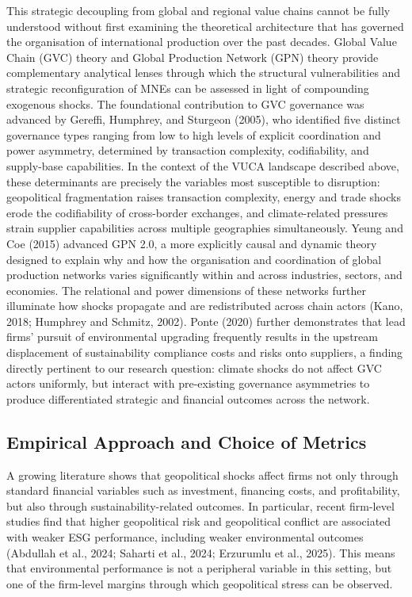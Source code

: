 \documentclass[authoryear,preprint,review,12pt]{elsarticle}
\begin{document}
This strategic decoupling from global and regional value chains cannot be fully understood without first examining the theoretical architecture that has governed the organisation of international production over the past decades. Global Value Chain (GVC) theory and Global Production Network (GPN) theory provide complementary analytical lenses through which the structural vulnerabilities and strategic reconfiguration of MNEs can be assessed in light of compounding exogenous shocks. The foundational contribution to GVC governance was advanced by Gereffi, Humphrey, and Sturgeon (2005), who identified five distinct governance types ranging from low to high levels of explicit coordination and power asymmetry, determined by transaction complexity, codifiability, and supply-base capabilities. In the context of the VUCA landscape described above, these determinants are precisely the variables most susceptible to disruption: geopolitical fragmentation raises transaction complexity, energy and trade shocks erode the codifiability of cross-border exchanges, and climate-related pressures strain supplier capabilities across multiple geographies simultaneously. Yeung and Coe (2015) advanced GPN 2.0, a more explicitly causal and dynamic theory designed to explain why and how the organisation and coordination of global production networks varies significantly within and across industries, sectors, and economies. The relational and power dimensions of these networks further illuminate how shocks propagate and are redistributed across chain actors (Kano, 2018; Humphrey and Schmitz, 2002). Ponte (2020) further demonstrates that lead firms' pursuit of environmental upgrading frequently results in the upstream displacement of sustainability compliance costs and risks onto suppliers, a finding directly pertinent to our research question: climate shocks do not affect GVC actors uniformly, but interact with pre-existing governance asymmetries to produce differentiated strategic and financial outcomes across the network.

\subsection{Empirical Approach and Choice of Metrics}

A growing literature shows that geopolitical shocks affect firms not only through standard financial variables such as investment, financing costs, and profitability, but also through sustainability-related outcomes. In particular, recent firm-level studies find that higher geopolitical risk and geopolitical conflict are associated with weaker ESG performance, including weaker environmental outcomes (Abdullah et al., 2024; Saharti et al., 2024; Erzurumlu et al., 2025). This means that environmental performance is not a peripheral variable in this setting, but one of the firm-level margins through which geopolitical stress can be observed.
\end{document}
